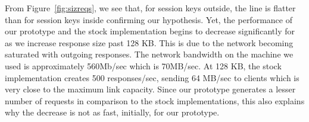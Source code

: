 \documentclass[../../../main.tex]{subfiles}
\begin{document}
From Figure~\ref{fig:sizreqs}, we see that, for session keys outside,
the line is flatter than for session keys inside confirming our
hypothesis. Yet, the performance of our prototype and the stock
implementation begins to decrease significantly for as we increase
response size past 128 KB. This is due to the network becoming
saturated with outgoing responses. The network bandwidth on the
machine we used is approximately 560Mb/sec which is 70MB/sec. At 128
KB, the stock implementation creates 500 responses/sec, sending 64
MB/sec to clients which is very close to the maximum link capacity.
Since our prototype generates a lesser number of requests in
comparison to the stock implementations, this also explains why the
decrease is not as fast, initially, for our prototype. 

\end{document}
